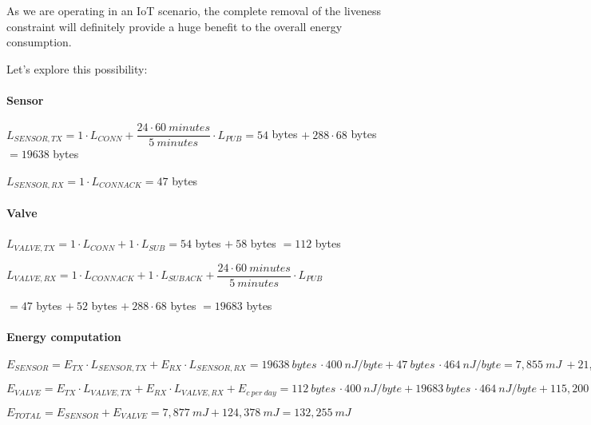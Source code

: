 \documentclass[a4paper,11pt]{article} %
\begin{document}
    As we are operating in an IoT scenario, the complete removal of the liveness constraint will definitely provide a huge benefit to the overall energy consumption.

    \smallskip

    Let's explore this possibility:

    \medskip

    \paragraph{Sensor}

    $L_{SENSOR, TX} = 1 \cdot L_{CONN} + \dfrac{24 \cdot 60\ minutes}{5\ minutes} \cdot L_{PUB} = 54$ bytes $+\ 288 \cdot 68$ bytes $ = 19638$ bytes

    \medskip

    $L_{SENSOR, RX} = 1 \cdot L_{CONNACK} = 47$ bytes

    \paragraph{Valve}

    $L_{VALVE, TX} = 1 \cdot L_{CONN} + 1 \cdot L_{SUB} = 54$ bytes $+\ 58$ bytes $ = 112$ bytes

    \medskip

    $L_{VALVE, RX} = 1 \cdot L_{CONNACK} + 1 \cdot L_{SUBACK} + \dfrac{24 \cdot 60\ minutes}{5\ minutes} \cdot L_{PUB}$

    \medskip

    \qquad \qquad \qquad $= 47$ bytes $+\ 52$ bytes $+\ 288 \cdot 68$ bytes $= 19683$ bytes

    \paragraph{Energy computation}

    $E_{SENSOR} = E_{TX} \cdot L_{SENSOR, TX} + E_{RX} \cdot L_{SENSOR, RX} = 19638\ bytes \, \cdot 400\ nJ/byte + 47\ bytes \, \cdot 464\ nJ/byte = 7,855\ mJ\ + 21,808\ \mu J = 7,877\ mJ$

    \medskip

    $E_{VALVE} = E_{TX} \cdot L_{VALVE, TX} + E_{RX} \cdot L_{VALVE, RX} + E_{c \ per \ day} = 112\ bytes \, \cdot 400\ nJ/byte + 19683\ bytes \, \cdot 464\ nJ/byte + 115,200\ mJ = 44,800\ \mu J + 9,132\ mJ + 115,200\ mJ = 124,378\ mJ$

    \medskip

    $E_{TOTAL} = E_{SENSOR} + E_{VALVE} = 7,877\ mJ + 124,378\ mJ = 132,255\ mJ$
\end{document}
